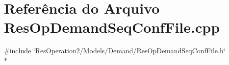 \section{Referência do Arquivo Res\+Op\+Demand\+Seq\+Conf\+File.\+cpp}
\label{_res_op_demand_seq_conf_file_8cpp}
{\ttfamily \#include \char`\"{}Res\+Operation2/\+Models/\+Demand/\+Res\+Op\+Demand\+Seq\+Conf\+File.\+h\char`\"{}}\\*
